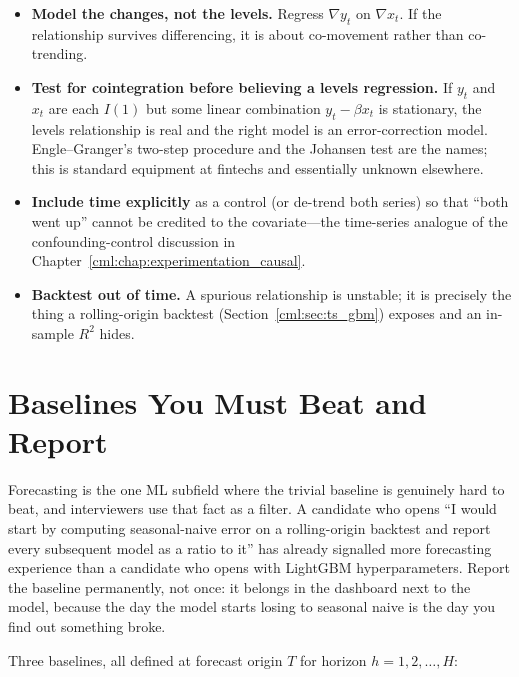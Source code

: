 \begin{itemize}
    \item \textbf{Model the changes, not the levels.} Regress $\nabla y_t$ on $\nabla x_t$. If the relationship survives differencing, it is about co-movement rather than co-trending.
    \item \textbf{Test for cointegration before believing a levels regression.} If $y_t$ and $x_t$ are each $I(1)$ but some linear combination $y_t - \beta x_t$ is stationary, the levels relationship is real and the right model is an error-correction model. Engle--Granger's two-step procedure and the Johansen test are the names; this is standard equipment at fintechs and essentially unknown elsewhere.
    \item \textbf{Include time explicitly} as a control (or de-trend both series) so that ``both went up'' cannot be credited to the covariate---the time-series analogue of the confounding-control discussion in Chapter~\ref{cml:chap:experimentation_causal}.
    \item \textbf{Backtest out of time.} A spurious relationship is unstable; it is precisely the thing a rolling-origin backtest (Section~\ref{cml:sec:ts_gbm}) exposes and an in-sample $R^2$ hides.
\end{itemize}

\section{Baselines You Must Beat and Report}
\label{cml:sec:ts_baselines}

\begin{keyinsight}
Forecasting is the one ML subfield where the trivial baseline is genuinely hard to beat, and interviewers use that fact as a filter. A candidate who opens ``I would start by computing seasonal-naive error on a rolling-origin backtest and report every subsequent model as a ratio to it'' has already signalled more forecasting experience than a candidate who opens with LightGBM hyperparameters. Report the baseline permanently, not once: it belongs in the dashboard next to the model, because the day the model starts losing to seasonal naive is the day you find out something broke.
\end{keyinsight}

Three baselines, all defined at forecast origin $T$ for horizon $h = 1, 2, \ldots, H$:

